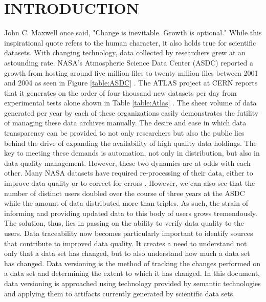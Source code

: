 
\chapter{INTRODUCTION}

John C. Maxwell once said, "Change is inevitable.  Growth is optional."
While this inspirational quote refers to the human character, it also holds true for scientific datasets.
With changing technology, data collected by researchers grew at an astounding rate.
NASA's Atmospheric Science Data Center (ASDC) reported a growth from hosting around five million files to twenty million files between 2001 and 2004 as seen in Figure \ref{table:ASDC} \cite{Barkstrom_digitallibrary}.
The ATLAS project at CERN reports that it generates on the order of four thousand new datasets per day from experimental tests alone shown in Table \ref{table:Atlas} \cite{Branco2008}.
The sheer volume of data generated per year by each of these organizations easily demonstrates the futility of managing these data archives manually.
The desire and ease in which data transparency can be provided to not only researchers but also the public lies behind the drive of expanding the availability of high quality data holdings.
The key to meeting these demands is automation, not only in distribution, but also in data quality management.
However, these two dynamics are at odds with each other.
Many NASA datasets have required re-processing of their data, either to improve data quality or to correct for errors \cite{barkstrom2014earth}.
However, we can also see that the number of distinct users doubled over the course of three years at the ASDC while the amount of data distributed more than triples.
As such, the strain of informing and providing updated data to this body of users grows tremendously.
The solution, thus, lies in passing on the ability to verify data quality to the users.
Data traceability now becomes particularly important to identify sources that contribute to improved data quality.
It creates a need to understand not only that a data set has changed, but to also understand how much a data set has changed.
Data versioning is the method of tracking the changes performed on a data set and determining the extent to which it has changed.
In this document, data versioning is approached using technology provided by semantic technologies and applying them to artifacts currently generated by scientific data sets.

